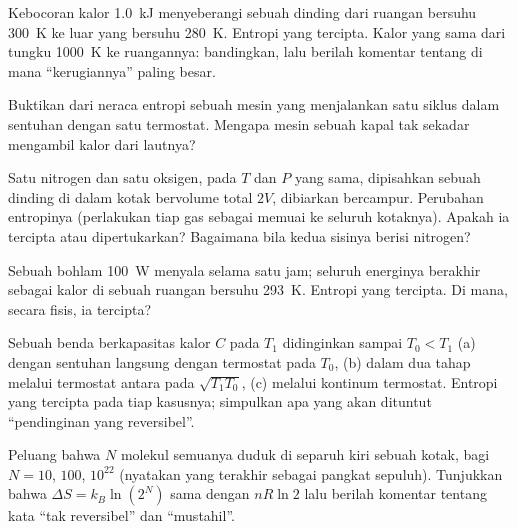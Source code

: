 \begin{exercise}[$\star\star$]\label{exo:b1:second-law-entropy:7}
Kebocoran kalor \qty{1.0}{kJ} menyeberangi sebuah dinding dari ruangan bersuhu \qty{300}{K} ke
luar yang bersuhu \qty{280}{K}. Entropi yang tercipta. Kalor yang sama dari tungku
\qty{1000}{K} ke ruangannya: bandingkan, lalu berilah komentar tentang di mana ``kerugiannya''
paling besar.
\end{exercise}

\begin{exercise}[$\star\star$]\label{exo:b1:second-law-entropy:8}
Buktikan  dari neraca entropi sebuah mesin yang menjalankan
satu siklus dalam sentuhan dengan satu termostat. Mengapa mesin sebuah kapal tak
sekadar mengambil kalor dari lautnya?
\end{exercise}

\begin{exercise}[$\star\star$]\label{exo:b1:second-law-entropy:9}
Satu  nitrogen dan satu  oksigen, pada $T$ dan $P$ yang sama,
dipisahkan sebuah dinding di dalam kotak bervolume total $2V$, dibiarkan bercampur. Perubahan
entropinya (perlakukan tiap gas sebagai memuai ke seluruh kotaknya). Apakah ia tercipta
atau dipertukarkan? Bagaimana bila kedua sisinya berisi nitrogen?
\end{exercise}

\begin{exercise}[$\star\star\star$]\label{exo:b1:second-law-entropy:10}
Sebuah bohlam \qty{100}{W} menyala selama satu jam; seluruh energinya berakhir sebagai kalor di
sebuah ruangan bersuhu \qty{293}{K}. Entropi yang tercipta. Di mana, secara fisis, ia
tercipta?
\end{exercise}

\begin{exercise}[$\star\star\star$]\label{exo:b1:second-law-entropy:11}
Sebuah benda berkapasitas kalor $C$ pada $T_1$ didinginkan sampai $T_0 < T_1$ (a) dengan
sentuhan langsung dengan termostat pada $T_0$, (b) dalam dua tahap melalui
termostat antara pada $\sqrt{T_1T_0}$, (c) melalui kontinum
termostat. Entropi yang tercipta pada tiap kasusnya; simpulkan apa yang akan dituntut
``pendinginan yang reversibel''.
\end{exercise}

\begin{exercise}[$\star\star\star$]\label{exo:b1:second-law-entropy:12}
Peluang bahwa $N$ molekul semuanya duduk di separuh kiri sebuah kotak, bagi
$N = 10$, $100$, $10^{22}$ (nyatakan yang terakhir sebagai pangkat sepuluh). Tunjukkan bahwa
$\Delta S = k_B\ln(2^N)$ sama dengan $nR\ln2$ lalu berilah komentar tentang kata
``tak reversibel'' dan ``mustahil''.
\end{exercise}

